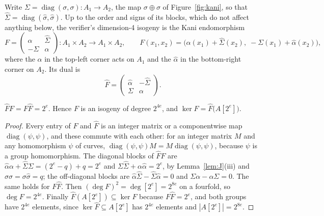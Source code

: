 Write $\Sigma = \operatorname{diag}(\sigma, \sigma) \colon A_1 \to A_2$, the
map $\sigma \oplus \sigma$ of Figure~\ref{fig:kani}, so that
$\widehat{\Sigma} = \operatorname{diag}(\widehat{\sigma},
\widehat{\sigma})$. Up to the order and signs of its blocks, which do not
affect anything below, the verifier's dimension-4 isogeny is the Kani
endomorphism~\cite[Section 4]{DLRW24}
\[
F = \begin{pmatrix} \alpha & \widehat{\Sigma} \\
    -\Sigma & \widehat{\alpha} \end{pmatrix}
\colon A_1 \times A_2 \longrightarrow A_1 \times A_2,
\qquad
F(x_1, x_2) = \bigl(\alpha(x_1) + \widehat{\Sigma}(x_2), \;
-\Sigma(x_1) + \widehat{\alpha}(x_2)\bigr),
\]
where the $\alpha$ in the top-left corner acts on $A_1$ and the
$\widehat{\alpha}$ in the bottom-right corner on $A_2$. Its dual is
\[
\widehat{F} = \begin{pmatrix} \widehat{\alpha} & -\widehat{\Sigma} \\
    \Sigma & \alpha \end{pmatrix}.
\]

\begin{lemma}
    \label{lem:kani}
    $\widehat{F} F = F \widehat{F} = 2^e$. Hence $F$ is an isogeny of degree
    $2^{4e}$, and $\ker F = \widehat{F}\bigl(A[2^e]\bigr)$.
\end{lemma}

\begin{proof}
    Every entry of $F$ and $\widehat{F}$ is an integer matrix or a
    componentwise map $\operatorname{diag}(\psi, \psi)$, and these commute with
    each other: for an integer matrix $M$ and any homomorphism $\psi$ of
    curves, $\operatorname{diag}(\psi, \psi) M = M \operatorname{diag}(\psi,
    \psi)$, because $\psi$ is a group homomorphism. The diagonal blocks of
    $\widehat{F} F$ are $\widehat{\alpha}\alpha + \widehat{\Sigma}\Sigma =
    (2^e - q) + q = 2^e$ and $\Sigma\widehat{\Sigma} + \alpha\widehat{\alpha}
    = 2^e$, by Lemma~\ref{lem:J}(iii) and $\widehat{\sigma}\sigma =
    \sigma\widehat{\sigma} = q$; the off-diagonal blocks are
    $\widehat{\alpha}\widehat{\Sigma} - \widehat{\Sigma}\widehat{\alpha} = 0$
    and $\Sigma\alpha - \alpha\Sigma = 0$. The same holds for
    $F\widehat{F}$. Then $(\deg F)^2 = \deg [2^e] = 2^{8e}$ on a fourfold, so
    $\deg F = 2^{4e}$. Finally $\widehat{F}(A[2^e]) \subseteq \ker F$ because
    $F\widehat{F} = 2^e$, and both groups have $2^{4e}$ elements, since
    $\ker \widehat{F} \subseteq A[2^e]$ has $2^{4e}$ elements and
    $|A[2^e]| = 2^{8e}$.
\end{proof}

